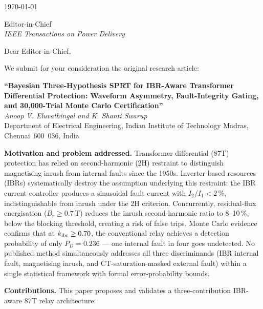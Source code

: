 \documentclass[11pt,a4paper]{article}
\begin{document}
\noindent
\today

\bigskip

\noindent
Editor-in-Chief\\
\textit{IEEE Transactions on Power Delivery}

\bigskip

\noindent
Dear Editor-in-Chief,

\medskip

We submit for your consideration the original research article:

\begin{center}
\textbf{``Bayesian Three-Hypothesis SPRT for IBR-Aware Transformer\\
Differential Protection: Waveform Asymmetry, Fault-Integrity Gating,\\
and 30,000-Trial Monte Carlo Certification''}\\[4pt]
\textit{Anoop V. Eluvathingal and K. Shanti Swarup}\\
Department of Electrical Engineering,
Indian Institute of Technology Madras, Chennai~600~036, India
\end{center}

\medskip\noindent\textbf{Motivation and problem addressed.}
Transformer differential (87T) protection has relied on second-harmonic (2H)
restraint to distinguish magnetising inrush from internal faults since the
1950s.
Inverter-based resources (IBRs) systematically destroy the assumption
underlying this restraint: the IBR current controller produces a sinusoidal
fault current with $I_2/I_1 < 2\,\%$, indistinguishable from inrush under
the 2H criterion.
Concurrently, residual-flux energisation ($B_r \geq 0.7\,$T) reduces the
inrush second-harmonic ratio to 8--10\,\%, below the blocking threshold,
creating a risk of false trips.
Monte Carlo evidence confirms that at $k_{\rm ibr} \geq 0.70$, the
conventional relay achieves a detection probability of only $P_D = 0.236$
--- one internal fault in four goes undetected.
No published method simultaneously addresses all three discriminands
(IBR internal fault, magnetising inrush, and CT-saturation-masked external
fault) within a single statistical framework with formal error-probability
bounds.

\medskip\noindent\textbf{Contributions.}
This paper proposes and validates a three-contribution IBR-aware 87T relay
architecture:
\end{document}
